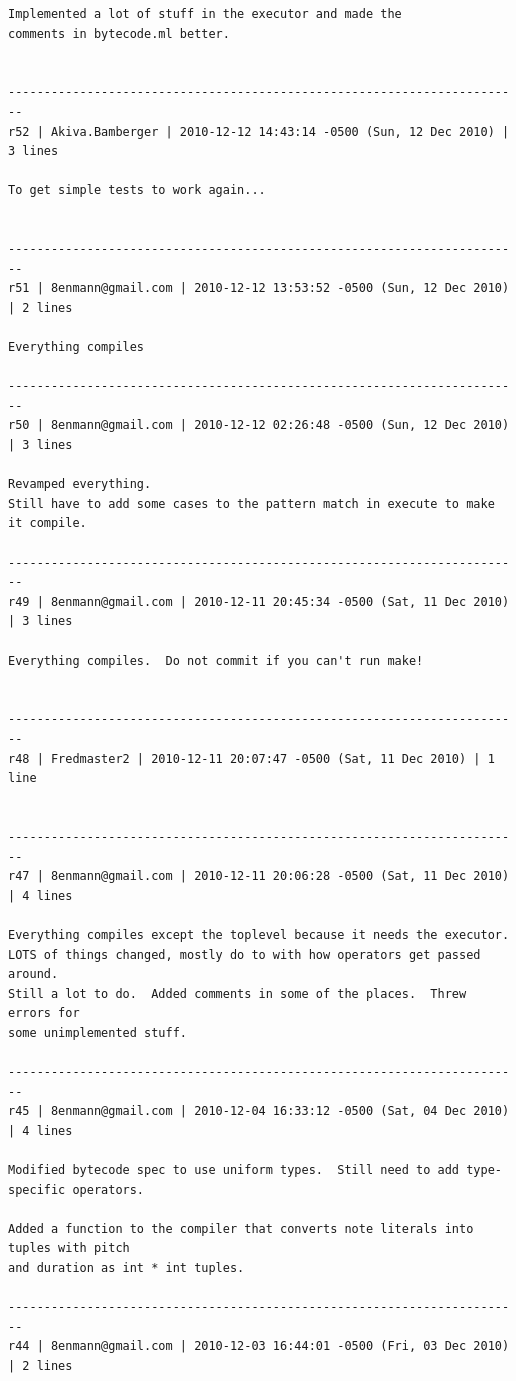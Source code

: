 \documentclass[12pt,A4]{book}
\begin{document}
\begin{verbatim}
Implemented a lot of stuff in the executor and made the 
comments in bytecode.ml better.


------------------------------------------------------------------------
r52 | Akiva.Bamberger | 2010-12-12 14:43:14 -0500 (Sun, 12 Dec 2010) | 3 lines

To get simple tests to work again...


------------------------------------------------------------------------
r51 | 8enmann@gmail.com | 2010-12-12 13:53:52 -0500 (Sun, 12 Dec 2010) | 2 lines

Everything compiles

------------------------------------------------------------------------
r50 | 8enmann@gmail.com | 2010-12-12 02:26:48 -0500 (Sun, 12 Dec 2010) | 3 lines

Revamped everything.
Still have to add some cases to the pattern match in execute to make it compile.

------------------------------------------------------------------------
r49 | 8enmann@gmail.com | 2010-12-11 20:45:34 -0500 (Sat, 11 Dec 2010) | 3 lines

Everything compiles.  Do not commit if you can't run make!


------------------------------------------------------------------------
r48 | Fredmaster2 | 2010-12-11 20:07:47 -0500 (Sat, 11 Dec 2010) | 1 line


------------------------------------------------------------------------
r47 | 8enmann@gmail.com | 2010-12-11 20:06:28 -0500 (Sat, 11 Dec 2010) | 4 lines

Everything compiles except the toplevel because it needs the executor.
LOTS of things changed, mostly do to with how operators get passed around.
Still a lot to do.  Added comments in some of the places.  Threw errors for 
some unimplemented stuff.

------------------------------------------------------------------------
r45 | 8enmann@gmail.com | 2010-12-04 16:33:12 -0500 (Sat, 04 Dec 2010) | 4 lines

Modified bytecode spec to use uniform types.  Still need to add type-specific operators.

Added a function to the compiler that converts note literals into tuples with pitch 
and duration as int * int tuples.

------------------------------------------------------------------------
r44 | 8enmann@gmail.com | 2010-12-03 16:44:01 -0500 (Fri, 03 Dec 2010) | 2 lines


\end{verbatim}
\end{document}
